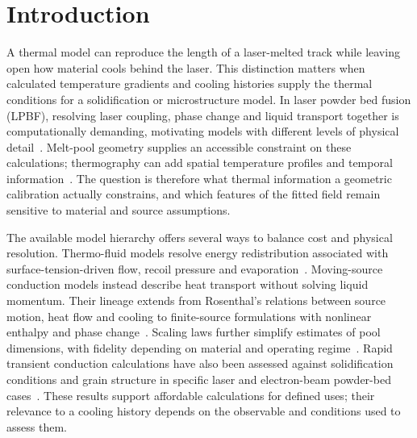 \section{Introduction}
\label{sec:introduction}

A thermal model can reproduce the length of a laser-melted track while leaving open how material cools behind the laser. This distinction matters when calculated temperature gradients and cooling histories supply the thermal conditions for a solidification or microstructure model. In laser powder bed fusion (LPBF), resolving laser coupling, phase change and liquid transport together is computationally demanding, motivating models with different levels of physical detail~\cite{king2015,review2024}. Melt-pool geometry supplies an accessible constraint on these calculations; thermography can add spatial temperature profiles and temporal information~\cite{hooper2018,myers2023}. The question is therefore what thermal information a geometric calibration actually constrains, and which features of the fitted field remain sensitive to material and source assumptions.

The available model hierarchy offers several ways to balance cost and physical resolution. Thermo-fluid models resolve energy redistribution associated with surface-tension-driven flow, recoil pressure and evaporation~\cite{khairallah2016}. Moving-source conduction models instead describe heat transport without solving liquid momentum. Their lineage extends from Rosenthal's relations between source motion, heat flow and cooling to finite-source formulations with nonlinear enthalpy and phase change~\cite{rosenthal1946,vanelsen2007}. Scaling laws further simplify estimates of pool dimensions, with fidelity depending on material and operating regime~\cite{rubenchik2018,naderi2023}. Rapid transient conduction calculations have also been assessed against solidification conditions and grain structure in specific laser and electron-beam powder-bed cases~\cite{Plotkowski2017Rapid}. These results support affordable calculations for defined uses; their relevance to a cooling history depends on the observable and conditions used to assess them.

